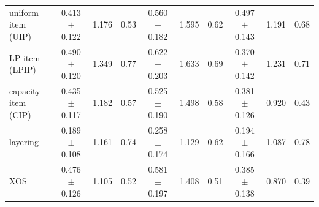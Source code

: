 \begin{table}[t]
\begin{tabular}{@{}lccccccccc@{}}
    uniform item (UIP) & 0.413 $\pm$ 0.122 & 1.176 & 0.53 & 0.560 $\pm$ 0.182 & 1.595 & 0.62 & 0.497 $\pm$ 0.143 & 1.191 & 0.68 \\
    LP item (LPIP) & 0.490 $\pm$ 0.120 & 1.349 & 0.77 & 0.622 $\pm$ 0.203 & 1.633 & 0.69 & 0.370 $\pm$ 0.142 & 1.231 & 0.71 \\
    capacity item (CIP) & 0.435 $\pm$ 0.117 & 1.182 & 0.57 & 0.525 $\pm$ 0.190 & 1.498 & 0.58 & 0.381 $\pm$ 0.126 & 0.920 & 0.43 \\
    layering & 0.189 $\pm$ 0.108 & 1.161 & 0.74 & 0.258 $\pm$ 0.174 & 1.129 & 0.62 & 0.194 $\pm$ 0.166 & 1.087 & 0.78 \\
    XOS & 0.476 $\pm$ 0.126 & 1.105 & 0.52 & 0.581 $\pm$ 0.197 & 1.408 & 0.51 & 0.385 $\pm$ 0.138 & 0.870 & 0.39 \\
    \bottomrule
  \end{tabular}
\end{table}
